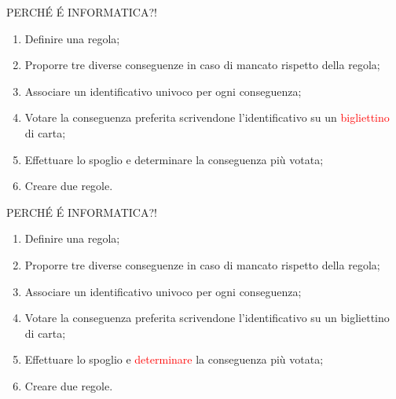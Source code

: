 \documentclass[aspectratio=1610]{beamer}
\begin{document}
\begin{frame}{PERCH\'E \'E INFORMATICA?!}
    \begin{enumerate}
        \item Definire una regola;
        \item Proporre tre diverse conseguenze in caso di mancato rispetto della regola;
        \item Associare un identificativo univoco per ogni conseguenza;
        \item Votare la conseguenza preferita scrivendone l'identificativo su un \textcolor{red}{bigliettino} di carta;
        \item Effettuare lo spoglio e determinare la conseguenza più votata;
        \item Creare due regole.
    \end{enumerate}
\end{frame}

\begin{frame}{PERCH\'E \'E INFORMATICA?!}
    \begin{enumerate}
        \item Definire una regola;
        \item Proporre tre diverse conseguenze in caso di mancato rispetto della regola;
        \item Associare un identificativo univoco per ogni conseguenza;
        \item Votare la conseguenza preferita scrivendone l'identificativo su un bigliettino di carta;
        \item Effettuare lo spoglio e \textcolor{red}{determinare} la conseguenza più votata;
        \item Creare due regole.
    \end{enumerate}
\end{frame}
\end{document}
